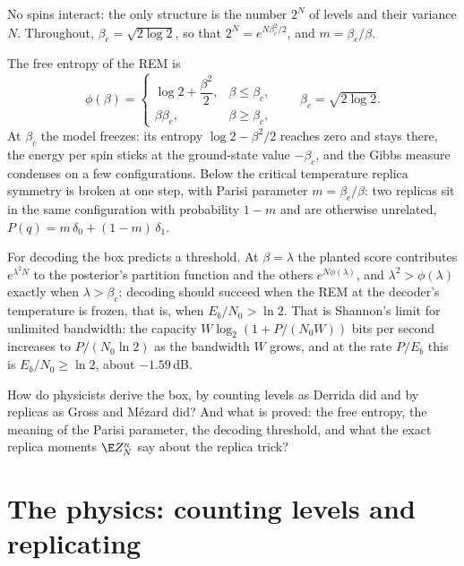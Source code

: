 \begin{refsection}
No spins interact: the only structure is the number $2^N$ of levels and their variance $N$. Throughout, $\beta_c=\sqrt{2\log2}$, so that $2^N=e^{N\beta_c^2/2}$, and $m=\beta_c/\beta$.

\begin{physicsbox}
The free entropy of the REM is
\begin{equation}\label{eq:rem:phi}
\phi(\beta)=\begin{cases}\log2+\dfrac{\beta^2}2,&\beta\le\beta_c,\\[1.2ex]\beta\beta_c,&\beta\ge\beta_c,\end{cases}\qquad\beta_c=\sqrt{2\log2}.
\end{equation}
At $\beta_c$ the model freezes: its entropy $\log2-\beta^2/2$ reaches zero and stays there, the energy per spin sticks at the ground-state value $-\beta_c$, and the Gibbs measure condenses on a few configurations. Below the critical temperature replica symmetry is broken at one step, with Parisi parameter $m=\beta_c/\beta$: two replicas sit in the same configuration with probability $1-m$ and are otherwise unrelated, $P(q)=m\,\delta_0+(1-m)\,\delta_1$.
\end{physicsbox}

For decoding the box predicts a threshold. At $\beta=\lambda$ the planted score contributes $e^{\lambda^2N}$ to the posterior's partition function and the others $e^{N\phi(\lambda)}$, and $\lambda^2>\phi(\lambda)$ exactly when $\lambda>\beta_c$: decoding should succeed when the REM at the decoder's temperature is frozen, that is, when $E_b/N_0>\ln2$. That is Shannon's limit for unlimited bandwidth: the capacity $W\log_2(1+P/(N_0W))$ bits per second \parencite{Shannon1949} increases to $P/(N_0\ln2)$ as the bandwidth $W$ grows, and at the rate $P/E_b$ this is $E_b/N_0\ge\ln2$, about $-1.59$\,dB.

How do physicists derive the box, by counting levels as Derrida did and by replicas as Gross and M\'ezard did? And what is proved: the free entropy, the meaning of the Parisi parameter, the decoding threshold, and what the exact replica moments $\E Z_N^n$ say about the replica trick?

\section{The physics: counting levels and replicating}\label{sec:rem:physics}


\end{refsection}
